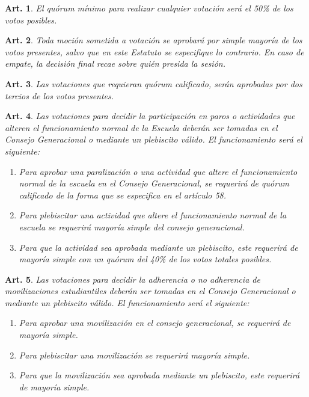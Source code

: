 \documentclass[letterpaper,11pt]{article}
\theoremstyle{plain}
\newtheorem{art}{Art.} %
\begin{document}
			\begin{art}\label{quorumMinimoVotacion}
				El quórum mínimo para realizar cualquier votación será el 50\% de los votos posibles.
			\end{art}

			\begin{art}\label{esquemaVotacion}
				Toda moción sometida a votación se aprobará por simple mayoría de los votos presentes, salvo que en este Estatuto se especifique lo contrario. En caso de empate, la decisión final recae sobre quién presida la sesión.
			\end{art}

			\begin{art}\label{quorumCalificado}
				Las votaciones que requieran quórum calificado, serán aprobadas por dos tercios de los votos presentes.
			\end{art}

			\begin{art}\label{votacionParo}
				Las votaciones para decidir la participación en paros o actividades que alteren el funcionamiento normal de la Escuela deberán ser tomadas en el Consejo Generacional o mediante un plebiscito válido. El funcionamiento será el siguiente:
				\begin{enumerate}
					\item Para aprobar una paralización o una actividad que altere el funcionamiento normal de la escuela en el Consejo Generacional, se requerirá de quórum calificado de la forma que se especifica en el artículo 58.
					\item Para plebiscitar una actividad que altere el funcionamiento normal de la escuela se requerirá mayoría simple del consejo generacional.
					\item Para que la actividad sea aprobada mediante un plebiscito, este requerirá de mayoría simple con un quórum del 40\% de los votos totales posibles.
				\end{enumerate}
			\end{art}

			\begin{art}\label{votacionMovilizacion}
				Las votaciones para decidir la adherencia o no adherencia de movilizaciones estudiantiles deberán ser tomadas en el Consejo Generacional o mediante un plebiscito válido. El funcionamiento será el siguiente:
				\begin{enumerate}
					\item Para aprobar una movilización en el consejo generacional, se requerirá de mayoría simple.
					\item Para plebiscitar una movilización se requerirá mayoría simple.
					\item Para que la movilización sea aprobada mediante un plebiscito, este requerirá de mayoría simple.
				\end{enumerate}
			\end{art}
\end{document}
